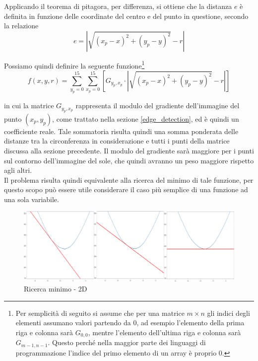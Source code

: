 \documentclass[12pt]{article}
\begin{document}
        \noindent
        Applicando il teorema di pitagora, per differenza, si ottiene che la distanza $ e $ è definita in funzione delle coordinate del centro e del punto in questione, secondo la relazione
        \begin{equation}
             e = \left| \sqrt{(x_p-x)^2 + (y_p-y)^2} -r \right|
        \end{equation}
        
        \noindent
        Possiamo quindi definire la seguente funzione\footnote{Per semplicità di seguito si assume che per una matrice $m \times n$ gli indici degli elementi assumano valori partendo da 0, ad esempio l'elemento della prima riga e colonna sarà $G_{0,0}$, mentre l'elemento dell'ultima riga e colonna sarà $G_{m-1, n-1}$. Questo perché nella maggior parte dei linguaggi di programmazione l'indice del primo elemento di un array è proprio 0.}
        \begin{equation}
            f(x, y, r) = \sum_{y_p = 0}^{15} \sum_{x_p = 0}^{15} \left[ G_{y_p, x_p} \cdot \left| \sqrt{(x_p-x)^2 + (y_p-y)^2} -r \right| \right] 
        \end{equation}
        
        \noindent
        in cui la matrice $ G_{y_p, x_p} $ rappresenta il modulo del gradiente dell'immagine del punto $ (x_p, y_p) $, come trattato nella sezione \ref{edge_detection}, ed è quindi un coefficiente reale. Tale sommatoria risulta quindi una somma ponderata delle distanze tra la circonferenza in considerazione e tutti i punti della matrice discussa alla sezione precedente. Il modulo del gradiente sarà maggiore per i punti sul contorno dell'immagine del sole, che quindi avranno un peso maggiore rispetto agli altri.\\
        
        Il problema risulta quindi equivalente alla ricerca del minimo di tale funzione, per questo scopo può essere utile considerare il caso più semplice di una funzione ad una sola variabile.
        
        \begin{figure}[h]
        \centering
            \includegraphics[width=\textwidth]{Draws/matplotlib_draws/2d_descent_block.png}
            \caption{Ricerca minimo - 2D}
            \label{2d_min_search}
        \end{figure}
        
\end{document}
